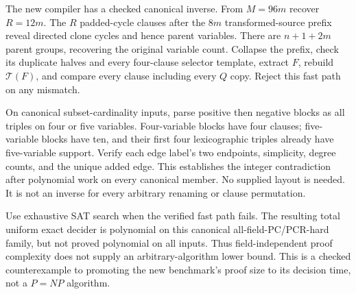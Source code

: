 \documentclass[11pt]{article}
\begin{document}
The new compiler has a checked canonical inverse. From $M=96m$ recover $R=12m$. The $R$ padded-cycle clauses after the $8m$ transformed-source prefix reveal directed clone cycles and hence parent variables. There are $n+1+2m$ parent groups, recovering the original variable count. Collapse the prefix, check its duplicate halves and every four-clause selector template, extract $F$, rebuild $\mathcal T(F)$, and compare every clause including every $Q$ copy. Reject this fast path on any mismatch.

On canonical subset-cardinality inputs, parse positive then negative blocks as all triples on four or five variables. Four-variable blocks have four clauses; five-variable blocks have ten, and their first four lexicographic triples already have five-variable support. Verify each edge label's two endpoints, simplicity, degree counts, and the unique added edge. This establishes the integer contradiction after polynomial work on every canonical member. No supplied layout is needed. It is not an inverse for every arbitrary renaming or clause permutation.

Use exhaustive SAT search when the verified fast path fails. The resulting total uniform exact decider is polynomial on this canonical all-field-PC/PCR-hard family, but not proved polynomial on all inputs. Thus field-independent proof complexity does not supply an arbitrary-algorithm lower bound. This is a checked counterexample to promoting the new benchmark's proof size to its decision time, not a $P=NP$ algorithm.
\end{document}
